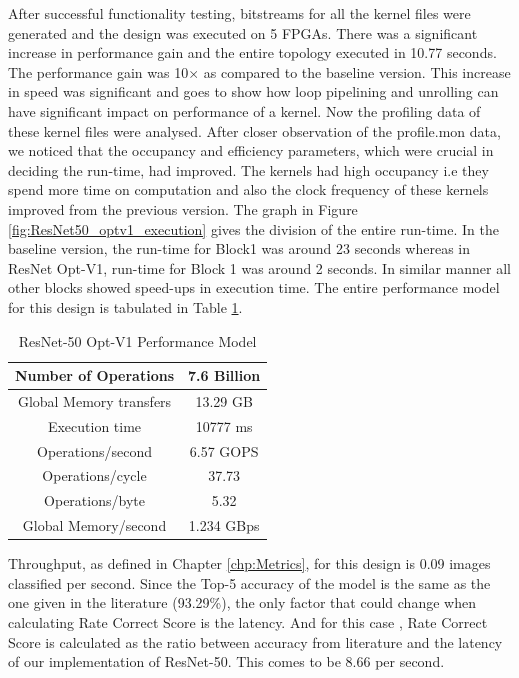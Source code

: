 After successful functionality testing, bitstreams for all the kernel files were generated and the design was executed on 5 FPGAs. There was a significant increase in performance gain and the entire topology executed in 10.77 seconds. The performance gain was 10$\times$ as compared to the baseline version. This increase in speed was significant and goes to show how loop pipelining and unrolling can have significant impact on performance of a kernel.
\newline
Now the profiling data of these kernel files were analysed. After closer observation of the profile.mon data, we noticed that the occupancy and efficiency parameters, which were crucial in deciding the run-time, had improved. The kernels had high occupancy i.e they spend more time on computation and also the clock frequency of these kernels improved from the previous version. The graph in Figure \ref{fig:ResNet50_optv1_execution} gives the division of the entire run-time. In the baseline version, the run-time for Block1 was around 23 seconds whereas in ResNet Opt-V1, run-time for Block 1 was around 2 seconds. In similar manner all other blocks showed speed-ups in execution time. The entire performance model for this design is tabulated in Table \ref{tab:ResNet50OptV1PerformanceModel}.  

\begin{table}[!htb]
\centering
\captionsetup{
justification = centering
}
\caption{ResNet-50 Opt-V1 Performance Model}
\label{tab:ResNet50OptV1PerformanceModel}
\begin{tabular}{|c|c|}
\hline
Number of Operations     & 7.6 Billion \\ \hline
Global Memory transfers & 13.29 GB    \\ \hline
Execution time             & 10777 ms    \\ \hline
Operations/second    & 6.57 GOPS   \\ \hline
Operations/cycle     & 37.73       \\ \hline
Operations/byte      & 5.32        \\ \hline
Global Memory/second    & 1.234 GBps  \\ \hline
\end{tabular}
\end{table}


Throughput, as defined in Chapter \ref{chp:Metrics}, for this design is 0.09 images classified per second. Since  the Top-5 accuracy of the model is the same as the one given in the literature (93.29\%), the only factor that could change when calculating Rate Correct Score is the latency. And for this case , Rate Correct Score is calculated as the ratio between accuracy from literature and the latency of our implementation of ResNet-50. This comes to be  8.66 per second.

